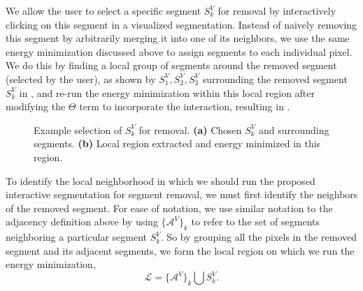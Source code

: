 \documentclass[]{spie}  %
\begin{document}
We allow the user to select a specific segment $S^V_k$ for removal by
interactively clicking on this segment in a visualized segmentation.
Instead of naively removing this segment by arbitrarily merging it
into one of its neighbors, we use the same energy minimization
discussed above to assign segments to each individual pixel.  We do
this by finding a local group of segments around the removed segment
(selected by the user), as shown by $S^V_1, S^V_2, S^V_3$ surrounding
the removed segment $S^V_k$ in , and re-run the
energy minimization within this local region after modifying the
$\Theta$ term to incorporate the interaction, resulting in
.
\begin{figure}[htbp]
\centering
{}
\hspace{0.1em}
\caption{Example selection of $S^V_k$ for removal.  \textbf{(a)}
  Chosen $S^V_k$ and surrounding segments.  \textbf{(b)} Local region
  extracted and energy minimized in this
  region.} \label{fig:removal-ex}
\end{figure}

To identify the local neighborhood in which we should run the proposed
interactive segmentation for segment removal, we must first identify
the neighbors of the removed segment.  For ease of notation, we use
similar notation to the adjacency definition above by using
$\{\mathcal{A}^V\}_k$ to refer to the set of segments neighboring a
particular segment $S^V_k$.  So by grouping all the pixels in the
removed segment and its adjacent segments, we form the local region on
which we run the energy minimization,
\begin{equation}
  \mathcal{L} = \{\mathcal{A}^V\}_k \bigcup S^V_k .
\end{equation}
\end{document}
